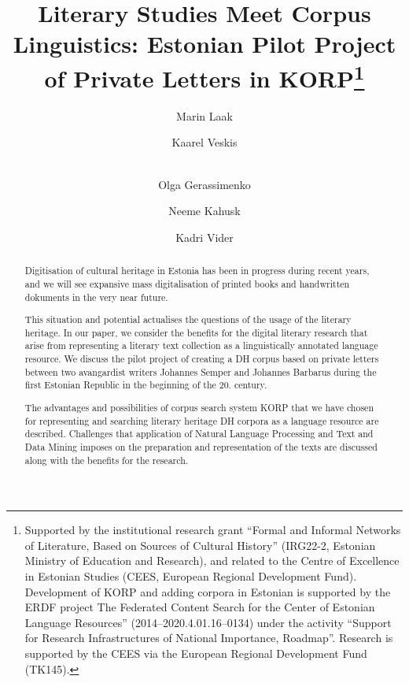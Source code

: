 \documentclass[runningheads]{llncs}
\begin{document}
%
\title{Literary Studies Meet Corpus Linguistics: Estonian Pilot Project of Private Letters in KORP\thanks{Supported by the institutional research grant “Formal and Informal Networks of Literature, Based on Sources of Cultural History” (IRG22-2, Estonian Ministry of Education and Research),  and related to the Centre of Excellence in Estonian Studies (CEES, European Regional Development Fund).  Development of KORP and adding corpora in Estonian is supported by the ERDF project The Federated Content Search for the Center of Estonian Language Resources'' (2014--2020.4.01.16--0134) under the activity ``Support for Research Infrastructures of National Importance, Roadmap''.  Research is supported by the CEES via the European Regional Development Fund (TK145).}}
%
%
\author{Marin Laak \and Kaarel Veskis \and\\
Olga Gerassimenko \and Neeme Kahusk \and
Kadri Vider}
%
%
%
\maketitle              %
%
\begin{abstract}
  Digitisation of cultural heritage in Estonia has been in progress during recent years, and we will see expansive mass digitalisation of printed books and handwritten dokuments in the very near future.
  
  This situation and potential actualises the questions of the usage of the literary heritage. In our paper, we consider the benefits for the digital literary research that arise from representing a literary text collection as a linguistically annotated language resource. We discuss the pilot project of creating a DH corpus based on private letters between two avangardist writers  Johannes Semper and Johannes Barbarus during the first Estonian Republic in the beginning of the 20. century.
  
The advantages and possibilities of corpus search system KORP that we have chosen for representing and searching literary heritage DH corpora as a language resource are described. Challenges that application of Natural Language Processing and Text and Data Mining imposes on the preparation and representation of the texts are discussed along with the benefits for the research. 



\end{abstract}
%
%
%
\end{document}
